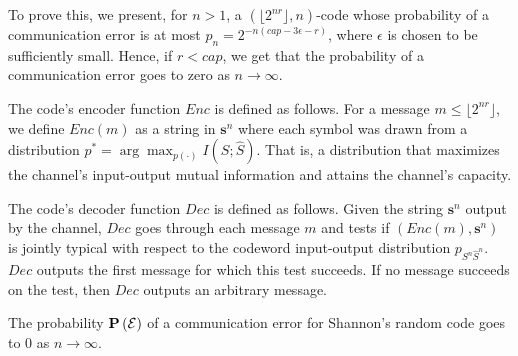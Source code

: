 To prove this, we present, for $n > 1$, a $(\lfloor 2^{nr}\rfloor, n)$-code whose probability of a communication error is at most $p_n = 2^{-n\left(\mathit{cap} - 3\epsilon - r\right)}$, where $\epsilon$ is chosen to be sufficiently small. Hence, if $r < \mathit{cap}$, we get that the probability of a communication error goes to zero as $n \to \infty$.

The code's encoder function $\mathit{Enc}$ is defined as follows. For a message $m \leq \lfloor 2^{nr}\rfloor$, we define $\mathit{Enc}(m)$ as a string in $\mathbf{s}^n$ where each symbol was drawn from a distribution $p^* = \arg\max_{p(\cdot)} I(S; \hat{S})$. That is, a distribution that maximizes the channel's input-output mutual information and attains the channel's capacity.

The code's decoder function $\mathit{Dec}$ is defined as follows. Given the string $\mathbf{s}^n$ output by the channel, $\mathit{Dec}$ goes through each message $m$ and tests if $(\mathit{Enc}(m), \mathbf{s}^n)$ is jointly typical with respect to the codeword input-output distribution $p_{S^n\hat{S}^n}$. $\mathit{Dec}$ outputs the first message for which this test succeeds. If no message succeeds on the test, then $\mathit{Dec}$ outputs an arbitrary message.


\begin{theorem}
The probability $\mathbf{P}\left(\mathcal{E}\right)$ of a communication error for Shannon's random code goes to 0 as $n \to \infty$.
\label{thm:shannon_random_code}
\end{theorem}

